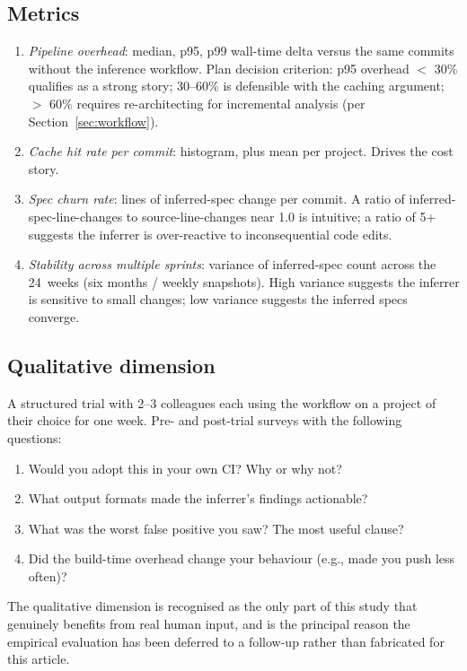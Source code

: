 \subsection{Metrics}

\begin{enumerate}
    \item \emph{Pipeline overhead}: median, p95, p99 wall-time delta versus the same commits without the inference workflow. Plan decision criterion: p95 overhead $<$ 30\% qualifies as a strong story; 30--60\% is defensible with the caching argument; $>$ 60\% requires re-architecting for incremental analysis (per Section~\ref{sec:workflow}).
    \item \emph{Cache hit rate per commit}: histogram, plus mean per project. Drives the cost story.
    \item \emph{Spec churn rate}: lines of inferred-spec change per commit. A ratio of inferred-spec-line-changes to source-line-changes near 1.0 is intuitive; a ratio of 5+ suggests the inferrer is over-reactive to inconsequential code edits.
    \item \emph{Stability across multiple sprints}: variance of inferred-spec count across the 24~weeks (six months / weekly snapshots). High variance suggests the inferrer is sensitive to small changes; low variance suggests the inferred specs converge.
\end{enumerate}

\subsection{Qualitative dimension}

A structured trial with 2--3 colleagues each using the workflow on a project of their choice for one week. Pre- and post-trial surveys with the following questions:

\begin{enumerate}
    \item Would you adopt this in your own CI? Why or why not?
    \item What output formats made the inferrer's findings actionable?
    \item What was the worst false positive you saw? The most useful clause?
    \item Did the build-time overhead change your behaviour (e.g., made you push less often)?
\end{enumerate}

The qualitative dimension is recognised as the only part of this study that genuinely benefits from real human input, and is the principal reason the empirical evaluation has been deferred to a follow-up rather than fabricated for this article.

